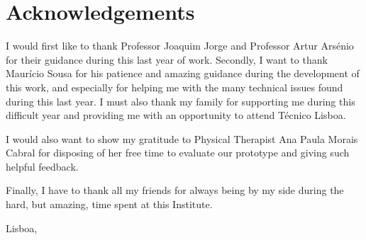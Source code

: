 \newpage

\chapter*{Acknowledgements}
\thispagestyle{empty}

I would first like to thank Professor Joaquim Jorge and Professor Artur Ars\'enio for their guidance during this last year of work.
Secondly, I want to thank Maur\'icio Sousa for his patience and amazing guidance during the development of this work, and especially for helping me with the many technical issues found during this last year.
I must also thank my family for supporting me during this difficult year and providing me with an opportunity to attend T\'ecnico Lisboa.

I would also want to show my gratitude to Physical Therapist Ana Paula Morais Cabral for disposing of her free time to evaluate our prototype and giving such helpful feedback.

Finally, I have to thank all my friends for always being by my side during the hard, but amazing, time spent at this Institute.


\vfill
\begin{flushright}
  \begin{minipage}{8cm}
    \begin{center}
      Lisboa, \date

      \avitima
    \end{center}
  \end{minipage}
\end{flushright}

